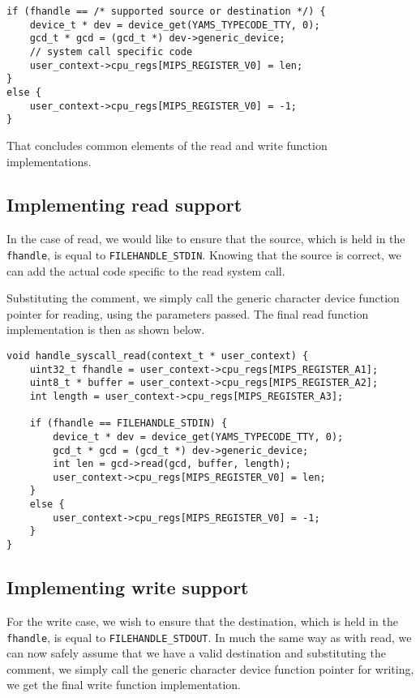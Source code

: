 \documentclass[11pt]{article}
\newcommand{\code}[1]{{\tt #1}}
\begin{document}
\begin{lstlisting}
if (fhandle == /* supported source or destination */) {
    device_t * dev = device_get(YAMS_TYPECODE_TTY, 0);
    gcd_t * gcd = (gcd_t *) dev->generic_device;
    // system call specific code
    user_context->cpu_regs[MIPS_REGISTER_V0] = len;
}
else {
    user_context->cpu_regs[MIPS_REGISTER_V0] = -1;
}
\end{lstlisting}

That concludes common elements of the read and write function implementations.

\subsection{Implementing read support}
In the case of read, we would like to ensure that the source, which is held
in the \code{fhandle}, is equal to \code{FILEHANDLE\_STDIN}. Knowing that the
source is correct, we can add the actual code specific to the read system
call.

Substituting the comment, we simply call the generic character device function
pointer for reading, using the parameters passed. The final read function
implementation is then as shown below.

\begin{lstlisting}
void handle_syscall_read(context_t * user_context) {
    uint32_t fhandle = user_context->cpu_regs[MIPS_REGISTER_A1];
    uint8_t * buffer = user_context->cpu_regs[MIPS_REGISTER_A2];
    int length = user_context->cpu_regs[MIPS_REGISTER_A3];

    if (fhandle == FILEHANDLE_STDIN) {
        device_t * dev = device_get(YAMS_TYPECODE_TTY, 0);
        gcd_t * gcd = (gcd_t *) dev->generic_device;
        int len = gcd->read(gcd, buffer, length);
        user_context->cpu_regs[MIPS_REGISTER_V0] = len;
    }
    else {
        user_context->cpu_regs[MIPS_REGISTER_V0] = -1;
    }
}
\end{lstlisting}

\subsection{Implementing write support}
For the write case, we wish to ensure that the destination, which is held in
the \code{fhandle}, is equal to \code{FILEHANDLE\_STDOUT}. In much the same
way as with read, we can now safely assume that we have a valid destination
and substituting the comment, we simply call the generic character device
function pointer for writing, we get the final write function implementation.
\end{document}
